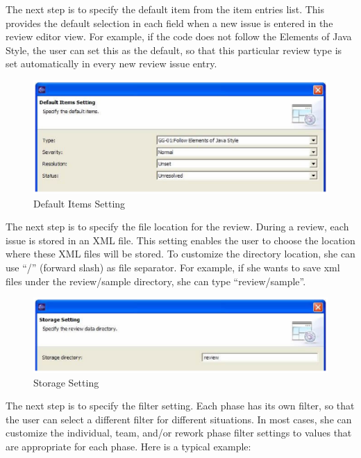 The next step is to specify the default item from the item entries list. This provides the default selection in each field when a new issue is entered in the review editor view. For example, if the code does not follow the Elements of Java Style, the user can set this as the default, so that this particular review type is set automatically in every new review issue entry.

\begin{figure}[htbp]
  \centering
  \includegraphics{images/fig3-9.eps}
  \caption{Default Items Setting}
  \label{fig3-9}
\end{figure}

The next step is to specify the file location for the review. During a review, each issue is stored in an XML file. This setting enables the user to choose the location where these XML files will be stored. To customize the directory location, she can use ``/'' (forward slash) as file separator. For example, if she wants to save xml files under the review/sample directory, she can type ``review/sample''.

\begin{figure}[htbp]
  \centering
  \includegraphics{images/fig3-10.eps}
  \caption{Storage Setting}
  \label{fig3-10}
\end{figure}

The next step is to specify the filter setting. Each phase has its own filter, so that the user can select a different filter for different situations. In most cases, she can customize the individual, team, and/or rework phase filter settings to values that are appropriate for each phase. Here is a typical example:

